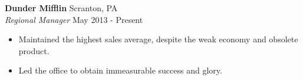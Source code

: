 \textbf{Dunder Mifflin} \hfill Scranton, PA\\
\textit{Regional Manager} \hfill May 2013 - Present\\
\vspace{-4pt}
\begin{itemize} \itemsep 1pt
	\item Maintained the highest sales average, despite the weak economy and obsolete product.
	\item Led the office to obtain immeasurable success and glory.
\end{itemize}
